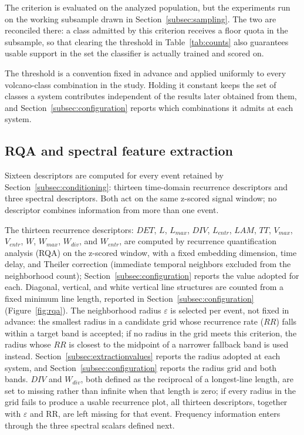 \documentclass[pdflatex,sn-mathphys-num]{sn-jnl}
\begin{document}
The criterion is evaluated on the analyzed population, but the experiments
run on the working subsample drawn in Section~\ref{subsec:sampling}. The two are reconciled there: a class admitted
by this criterion receives a floor quota in the subsample, so that clearing
the threshold in Table~\ref{tab:counts} also guarantees usable support in the
set the classifier is actually trained and scored on.

The threshold is a convention fixed in advance and applied uniformly to every
volcano-class combination in the study. Holding it constant keeps the set of
classes a system contributes independent of the results later obtained from
them, and Section~\ref{subsec:configuration} reports which combinations it admits at
each system.

\subsection{RQA and spectral feature extraction}\label{subsec:features}

Sixteen descriptors are computed for every event retained by
Section~\ref{subsec:conditioning}: thirteen time-domain recurrence
descriptors and three spectral descriptors. Both act on the same z-scored
signal window; no descriptor combines information from more than one event.

The thirteen recurrence descriptors: $DET$, $L$, $L_{max}$, $DIV$, $L_{entr}$, $LAM$, $TT$,
$V_{max}$, $V_{entr}$, $W$, $W_{max}$, $W_{div}$, and $W_{entr}$, are computed by recurrence
quantification analysis (RQA) \cite{marwan_recurrence_2007} on the z-scored window, with a fixed
embedding dimension, time delay, and Theiler correction (immediate temporal
neighbors excluded from the neighborhood count); Section~\ref{subsec:configuration}
reports the value adopted for each.
Diagonal, vertical, and white vertical line structures are counted from a
fixed minimum line length, reported in Section~\ref{subsec:configuration}
(Figure~\ref{fig:rqa}). The neighborhood radius $\varepsilon$ is
selected per event, not fixed in advance: the smallest radius in a candidate
grid whose recurrence rate ($RR$) falls within a target band is
accepted; if no radius in the grid meets this criterion, the radius whose $RR$
is closest to the midpoint of a narrower fallback band
is used instead. Section~\ref{subsec:extractionvalues} reports the radius adopted
at each system, and Section~\ref{subsec:configuration} reports the radius grid and both
bands. $DIV$ and $W_{div}$, both defined as the reciprocal of a
longest-line length, are set to missing rather than infinite when that
length is zero; if every radius in the grid fails to produce a usable
recurrence plot, all thirteen descriptors, together with $\varepsilon$ and
RR, are left missing for that event. Frequency information enters through the
three spectral scalars defined next.
\end{document}
